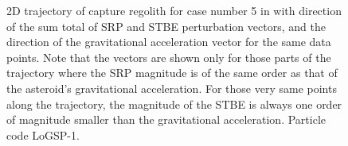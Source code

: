 \begin{figure}[htb]
\centering
\captionsetup{justification=centering}
\caption{2D trajectory of capture regolith for case number 5 in  with direction of the sum total of \gls{SRP} and \gls{STBE} perturbation vectors, and the direction of the gravitational acceleration vector for the same data points. Note that the vectors are shown only for those parts of the trajectory where the \gls{SRP} magnitude is of the same order as that of the asteroid's gravitational acceleration. For those very same points along the trajectory, the magnitude of the \gls{STBE} is always one order of magnitude smaller than the gravitational acceleration. Particle code LoGSP-1.}
\end{figure}

